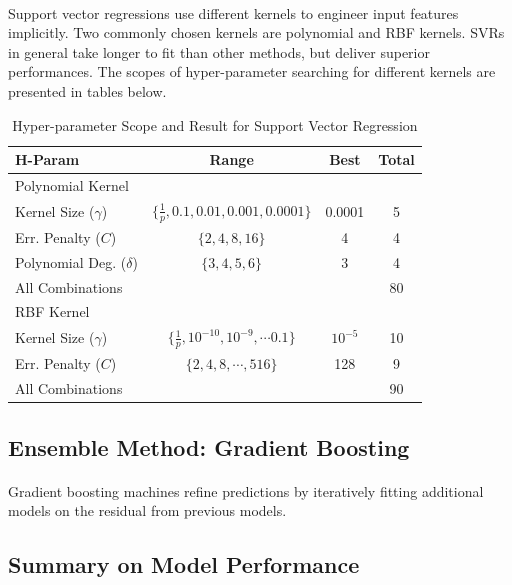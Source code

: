\documentclass[11pt]{article}
\begin{document}
	\paragraph{} Support vector regressions use different kernels to engineer input features implicitly. Two commonly chosen kernels are polynomial and RBF kernels. SVRs in general take longer to fit than other methods, but deliver superior performances. The scopes of hyper-parameter searching for different kernels are presented in tables below.
	\begin{table}[H]
		\centering
		\begin{tabular}{l|c|c|c}
 		H-Param & Range & Best & Total \\
 		\hline
 		\hline
 		Polynomial Kernel \\
 		\hline
 		Kernel Size ($\gamma$) & $\{\frac{1}{p}, 0.1, 0.01, 0.001, 0.0001\}$ & 0.0001 & 5 \\
 		Err. Penalty ($C$)& $\{2, 4, 8, 16\}$ & 4 & 4 \\
 		Polynomial Deg. ($\delta$)& $\{3, 4, 5, 6\}$ & 3 & 4 \\
 		\hline
 		All Combinations & & & 80 \\
 		\hline
 		\hline
 		RBF Kernel \\
 		\hline
 		Kernel Size ($\gamma$) & $\{\frac{1}{p}, 10^{-10}, 10^{-9}, \cdots 0.1\}$ & $10^{-5}$ & 10 \\
 		Err. Penalty ($C$)& $\{2, 4, 8, \cdots, 516\}$ & 128 & 9 \\
 		\hline
 		All Combinations & & & 90
		\end{tabular}
		\caption{Hyper-parameter Scope and Result for Support Vector Regression}
	\end{table}

	\subsection{Ensemble Method: Gradient Boosting}
	\paragraph{} Gradient boosting machines refine predictions by iteratively fitting additional models on the residual from previous models.
	
	\subsection{Summary on Model Performance}
\end{document}
